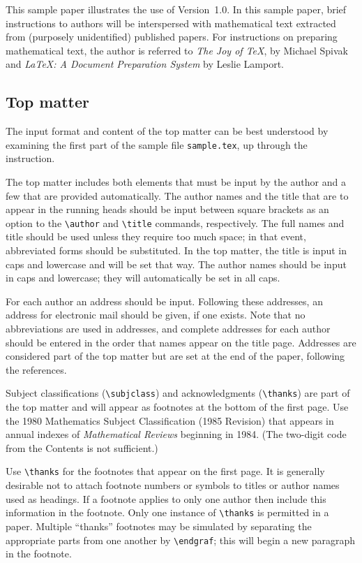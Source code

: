 This sample paper illustrates the use of \AmSLaTeX{} Version~1.0. In this
sample paper, brief instructions to authors will be interspersed with
mathematical text extracted from (purposely unidentified) published papers. 
For instructions on preparing mathematical text, the author is referred to {\it
The Joy of \TeX}, by Michael Spivak \cite{spivak:jot} and {\it \LaTeX{}: A
Document Preparation System} by Leslie Lamport. \cite{lamport:latex}

\subsection{Top matter}
The input format and content of the top matter can be best understood
by examining the first part of the sample file \verb+sample.tex+, up
through the \verb++ instruction.

The top matter includes both elements that must be input by the author and a
few that are provided automatically.  The author names and the title that are
to appear in the running heads should be input between square brackets as an
option to the \verb+\author+ and \verb+\title+ commands, respectively. The full
names and title should be used unless they require too much space; in that
event, abbreviated forms should be substituted. In the top matter, the title is
input in caps and lowercase and will be set that way.  The author names should
be input in caps and lowercase; they will automatically be set in all caps.

For each author an address should be input.    Following these addresses, an
address for electronic mail should be given, if one exists. Note that no
abbreviations are used in addresses, and complete addresses for each author
should be entered in the order that names appear on the title page.  Addresses
are considered part of the top matter but are set at the end of the paper,
following the references.

Subject classifications (\verb+\subjclass+) and acknowledgments
(\verb+\thanks+) are part of the top matter and will appear as footnotes at the
bottom of the first page.  Use the 1980 Mathematics Subject Classification
(1985 Revision) that appears in annual indexes of {\it Mathematical Reviews\/}
beginning in 1984.  (The two-digit code from the Contents is not sufficient.)

Use \verb+\thanks+ for the footnotes that appear on the first page.  It is
generally desirable not to attach footnote numbers or symbols to titles or
author names used as headings.  If a footnote applies to only one author then
include this information in the footnote.  Only one instance of
\verb+\thanks+ is permitted in a paper.  Multiple ``thanks'' footnotes may
be simulated by separating the appropriate parts from one another by
\verb+\endgraf+; this will begin a new paragraph in the footnote.

